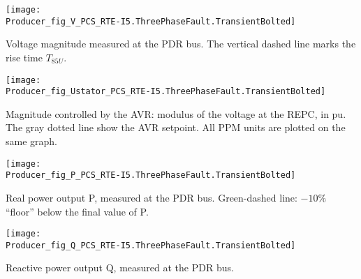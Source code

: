     \noindent
    \begin{minipage}[t]{0.48\textwidth}
        \centering
        \texttt{[image: \\Producer\_fig\_V\_PCS\_RTE-I5.ThreePhaseFault.TransientBolted]}
        \begin{minipage}[t]{0.8\textwidth}
            \small Voltage magnitude measured at the PDR bus.
            The vertical dashed line marks the rise time $T_{85U}$.
        \end{minipage}
    \end{minipage}
    \hfill
    \begin{minipage}[t]{0.48\textwidth}
        \centering
        \texttt{[image: \\Producer\_fig\_Ustator\_PCS\_RTE-I5.ThreePhaseFault.TransientBolted]}
        \begin{minipage}[t]{0.8\textwidth}
            \small Magnitude controlled by the AVR: modulus of the voltage at the REPC, in pu.
            The gray dotted line show the AVR setpoint. All PPM units are plotted on the same
            graph.
        \end{minipage}
    \end{minipage}

    \vspace{0.5cm}

    \noindent
    \begin{minipage}[t]{0.48\textwidth}
        \centering
        \texttt{[image: \\Producer\_fig\_P\_PCS\_RTE-I5.ThreePhaseFault.TransientBolted]}
        \begin{minipage}[t]{0.8\textwidth}
            \small Real power output P, measured at the PDR bus. Green-dashed
            line: $-10\%$ ``floor'' below the final value of P.
        \end{minipage}
    \end{minipage}
    \hfill
    \begin{minipage}[t]{0.48\textwidth}
        \centering
        \texttt{[image: \\Producer\_fig\_Q\_PCS\_RTE-I5.ThreePhaseFault.TransientBolted]}
        \begin{minipage}[t]{0.8\textwidth}
            \small Reactive power output Q, measured at the PDR bus.
        \end{minipage}
    \end{minipage}

    \vspace{0.5cm}

